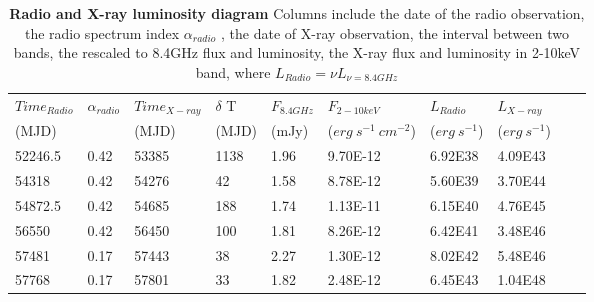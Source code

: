 \begin{table}
\centering
\caption{{\bf Radio and X-ray luminosity diagram} Columns include the date of the radio observation, the radio spectrum index $\alpha_{radio}$ , the date of X-ray observation, the interval between two bands, the rescaled to 8.4GHz flux and luminosity, the X-ray flux and luminosity in 2-10keV band, where $L_{Radio}=\nu {L_{\nu =8.4GHz}}$}
\label{tab:table4}
\begin{tabular}{llllllllll}
\hline
\hline

$Time_{Radio}$ &  $\alpha_{radio}$ & $Time_{X-ray}$ & $\delta$ T & $F_{8.4GHz}$ & $F_{2-10keV}$ & $L_{Radio}$ & $L_{X-ray}$ \\ 
(MJD)  &  & (MJD)  &(MJD)  &(mJy) &($erg~s^{-1}~cm^{-2}$) & ($erg~s^{-1} $)& ($erg~s^{-1} $) \\
\hline

52246.5  & 0.42 & 53385 & 1138 & 1.96 & 9.70E-12 & 6.92E38 & 4.09E43 \\ 
54318 &   0.42 & 54276 & 42 & 1.58 & 8.78E-12 & 5.60E39 & 3.70E44 \\ 
54872.5   & 0.42 & 54685 & 188 & 1.74 & 1.13E-11 & 6.15E40 & 4.76E45 \\ 
56550 &  0.42 & 56450 & 100 & 1.81 & 8.26E-12 & 6.42E41 & 3.48E46 \\ 
57481 &   0.17 & 57443 & 38 & 2.27 & 1.30E-12 & 8.02E42 & 5.48E46 \\ 
57768 &  0.17 & 57801 & 33 & 1.82 & 2.48E-12 & 6.45E43 & 1.04E48 \\ \hline

\end{tabular}
\end{table}